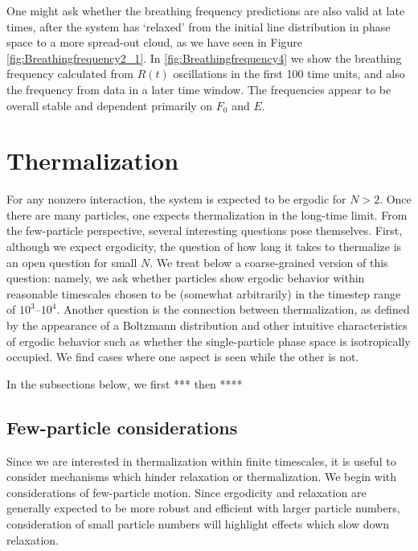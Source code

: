 \documentclass[onecolumn,pra]{revtex4-1}
\begin{document}
One might ask whether the breathing frequency predictions are also valid at late times, after the
system has `relaxed' from the initial line distribution in phase space to a more spread-out cloud,
as we have seen in Figure \ref{fig:Breathingfrequency2_1}.  In \ref{fig:Breathingfrequency4} we show
the breathing frequency calculated from $R(t)$ oscillations in the first 100 time units, and also
the frequency from data in a later time window. The frequencies appear to be overall stable and dependent
primarily on $F_0$ and $E$.  




\section{Thermalization}\label{section:Thermalization}


For any nonzero interaction, the system is expected to be ergodic for $N>2$.  Once there are many
particles, one expects thermalization in the long-time limit.  From the few-particle perspective,
several interesting questions pose themselves.  First, although we expect ergodicity, the question
of how long it takes to thermalize is an open question for small $N$. We treat below a
coarse-grained version of this question: namely, we ask whether particles show ergodic behavior
within reasonable timescales chosen to be (somewhat arbitrarily) in the timestep range of
$10^3$--$10^4$.  Another question is the connection between thermalization, as defined by the
appearance of a Boltzmann distribution and other intuitive characteristics of ergodic behavior such
as whether the single-particle phase space is isotropically occupied.  We find cases where one
aspect is seen while the other is not.  

In the subsections below, we first ***  then **** 






\subsection{Few-particle considerations}

Since we are interested in thermalization within finite timescales, it is useful to consider
mechanisms which hinder relaxation or thermalization.  We begin with considerations of few-particle
motion.  Since ergodicity and relaxation are generally expected to be more robust and efficient with
larger particle numbers, consideration of small particle numbers will highlight effects which slow
down relaxation.
\end{document}
